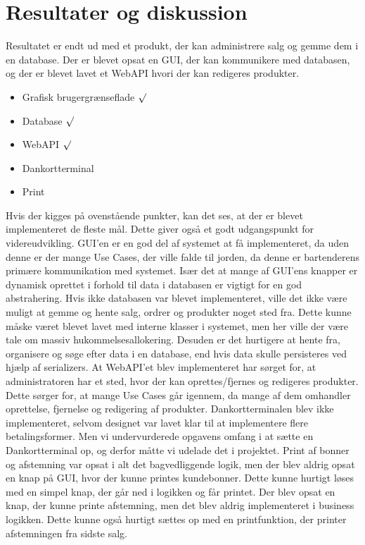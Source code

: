 \section{Resultater og diskussion}
Resultatet er endt ud med et produkt, der kan administrere salg og gemme dem i en database. Der er blevet opsat en \gls{GUI}, der kan kommunikere med databasen, og der er blevet lavet et \gls{WebAPI} hvori der kan redigeres produkter. 

\begin{itemize}
	\item Grafisk brugergrænseflade $\surd$
	\item Database $\surd$
	\item \gls{WebAPI} $\surd$
	\item Dankortterminal
	\item Print
\end{itemize}  

Hvis der kigges på ovenstående punkter, kan det ses, at der er blevet implementeret de fleste mål. Dette giver også et godt udgangspunkt for videreudvikling. 
\gls{GUI}'en er en god del af systemet at få implementeret, da uden denne er der mange Use Cases, der ville falde til jorden, da denne er bartenderens primære kommunikation med systemet. Især det at mange af \gls{GUI}'ens knapper er dynamisk oprettet i forhold til data i databasen er vigtigt for en god abstrahering.\newline 
Hvis ikke databasen var blevet implementeret, ville det ikke være muligt at gemme og hente salg, ordrer og produkter noget sted fra. Dette kunne måske været blevet lavet med interne klasser i systemet, men her ville der være tale om massiv hukommelsesallokering. Desuden er det hurtigere at hente fra, organisere og søge efter data i en database, end hvis data skulle persisteres ved hjælp af serializers.  
\newline
\newline
At \gls{WebAPI}'et blev implementeret har sørget for, at administratoren har et sted, hvor der kan oprettes/fjernes og redigeres produkter. Dette sørger for, at mange Use Cases går igennem, da mange af dem omhandler oprettelse, fjernelse og redigering af produkter.  
\newline
\newline
Dankortterminalen blev ikke implementeret, selvom designet var lavet klar til at implementere flere betalingsformer. Men vi undervurderede opgavens omfang i at sætte en Dankortterminal op, og derfor måtte vi udelade det i projektet. 
\newline
\newline
Print af bonner og afstemning var opsat i alt det bagvedliggende logik, men der blev aldrig opsat en knap på \gls{GUI}, hvor der kunne printes kundebonner. Dette kunne hurtigt løses med en simpel knap, der går ned i logikken og får printet. Der blev opsat en knap, der kunne printe afstemning, men det blev aldrig implementeret i business logikken. Dette kunne også hurtigt sættes op med en printfunktion, der printer afstemningen fra sidste salg.  
 